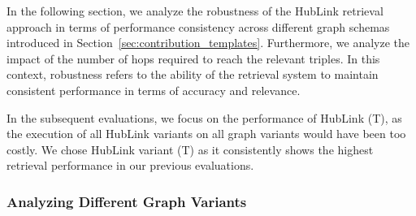 In the following section, we analyze the robustness of the HubLink retrieval approach in terms of performance consistency across different graph schemas introduced in Section~\ref{sec:contribution_templates}. Furthermore, we analyze the impact of the number of hops required to reach the relevant triples. In this context, robustness refers to the ability of the retrieval system to maintain consistent performance in terms of accuracy and relevance.

In the subsequent evaluations, we focus on the performance of HubLink (T), as the execution of all HubLink variants on all graph variants would have been too costly. We chose HubLink variant (T) as it consistently shows the highest retrieval performance in our previous evaluations. 

\subsubsection{Analyzing Different Graph Variants}
